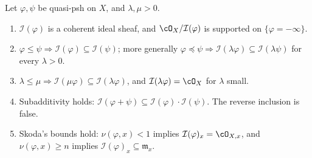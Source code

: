 \begin{proposition}\label{prop:ch51-ideal-formal}
Let $\varphi,\psi$ be quasi-psh on $X$, and $\lambda,\mu>0$.
\begin{enumerate}
\item\label{itm:ch51-if:coherent}
      $\mathcal I(\varphi)$ is a coherent ideal sheaf, and
      $\cO_X/\mathcal I(\varphi)$ is supported on
      $\{\varphi=-\infty\}$.
\item\label{itm:ch51-if:monotone}
      $\varphi\leq\psi\Rightarrow
      \mathcal I(\varphi)\subseteq\mathcal I(\psi)$; more generally
      $\varphi\preceq\psi\Rightarrow
      \mathcal I(\lambda\varphi)\subseteq\mathcal I(\lambda\psi)$ for
      every $\lambda>0$.
\item\label{itm:ch51-if:scale}
      $\lambda\leq\mu\Rightarrow
      \mathcal I(\mu\varphi)\subseteq\mathcal I(\lambda\varphi)$, and
      $\mathcal I(\lambda\varphi)=\cO_X$ for $\lambda$ small.
\item\label{itm:ch51-if:product}
      Subadditivity holds:
      $\mathcal I(\varphi+\psi)\subseteq
      \mathcal I(\varphi)\cdot\mathcal I(\psi)$.  The reverse inclusion
      is false.
\item\label{itm:ch51-if:skoda-bounds}
      Skoda's bounds hold:
      $\nu(\varphi,x)<1$ implies
      $\mathcal I(\varphi)_x=\cO_{X,x}$, and
      $\nu(\varphi,x)\geq n$ implies
      $\mathcal I(\varphi)_x\subseteq\mathfrak m_x$.
\end{enumerate}
\end{proposition}

